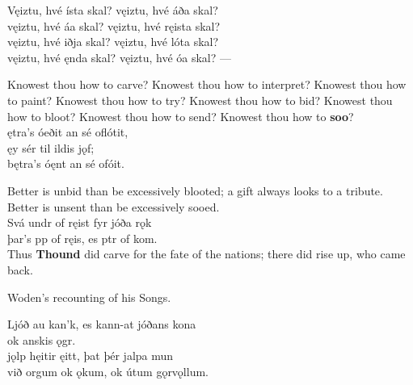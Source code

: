 \bva Vęiztu, hvé ísta skal? \hld vęiztu, hvé áða skal? \\%
vęiztu, hvé áa skal? \hld vęiztu, hvé ręista skal? \\%
vęiztu, hvé iðja skal? \hld vęiztu, hvé lóta skal? \\%
vęiztu, hvé ęnda skal? \hld vęiztu, hvé óa skal? —\footnotemark[5]\\%

\bvb Knowest thou how to carve? Knowest thou how to interpret? Knowest thou how to paint? Knowest thou how to try? Knowest thou how to bid? Knowest thou how to bloot? Knowest thou how to send? Knowest thou how to \textbf{soo}? \\

\bva {}ętra's óeðit \hld an sé oflótit, \\%
\ind ęy sér til ildis jǫf; \\%
bętra's óęnt \hld an sé ofóit.\footnotemark[6]\\%

\bvb Better is unbid than be excessively blooted; a gift always looks to a tribute. Better is unsent than be excessively sooed. \\

\bva Svá undr of ręist \hld fyr jóða rǫk \\%
þar's pp of ręis, \hld es ptr of kom.\\%

\bvb Thus \textbf{Thound} did carve for the fate of the nations; there did rise up, who came back.\footnotemark[8] \\


	Woden's recounting of his Songs.

\bva Ljóð au kan'k, \hld es kann-at jóðans kona \\%
\ind ok anskis ǫgr. \\%
jǫlp hęitir ęitt, \hld þat þér jalpa mun \\%
\ind við orgum ok ǫkum, \hld ok útum gǫrvǫllum.\\%

